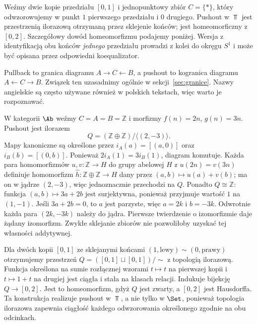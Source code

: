 \begin{przyklad}
Weźmy dwie kopie przedziału $[0,1]$ i jednopunktowy zbiór $C=\{*\}$, który odwzorowujemy w punkt $1$ pierwszego przedziału i $0$ drugiego. Pushout w $\Top$ jest przestrzenią ilorazową otrzymaną przez sklejenie końców; jest homeomorficzny z $[0,2]$. Szczegółowy dowód homeomorfizmu podajemy poniżej. Wersja z identyfikacją obu końców \emph{jednego} przedziału prowadzi z kolei do okręgu $S^1$ i może być opisana przez odpowiedni koequalizator.
\end{przyklad}

\begin{uwaga}
Pullback to granica diagramu $A\to C\leftarrow B$, a pushout to kogranica diagramu $A\leftarrow C\to B$. Związek ten uzasadnimy ogólnie w sekcji~\ref{sec:granice}. Nazwy angielskie są często używane również w polskich tekstach, więc warto je rozpoznawać.
\end{uwaga}


\begin{przyklad}
W kategorii $\Ab$ weźmy $C=A=B=\mathbb Z$ i morfizmy $f(n)=2n$, $g(n)=3n$. Pushout jest ilorazem
\[
Q=(\mathbb Z\oplus\mathbb Z)/\langle(2,-3)\rangle.
\]
Mapy kanoniczne są określone przez $i_A(a)=[(a,0)]$ oraz $i_B(b)=[(0,b)]$. Ponieważ $2i_A(1)=3i_B(1)$, diagram komutuje. Każda para homomorfizmów $u,v:\mathbb Z\to H$ do grupy abelowej $H$ z $u(2n)=v(3n)$ definiuje homomorfizm $\widehat h:\mathbb Z\oplus\mathbb Z\to H$ dany przez $(a,b)\mapsto u(a)+v(b)$; ma on w jądrze $(2,-3)$, więc jednoznacznie przechodzi na $Q$. Ponadto $Q\cong\mathbb Z$: funkcja $(a,b)\mapsto3a+2b$ jest surjektywna, ponieważ przyjmuje wartość $1$ na $(1,-1)$. Jeśli $3a+2b=0$, to $a$ jest parzyste, więc $a=2k$ i $b=-3k$. Odwrotnie każda para $(2k,-3k)$ należy do jądra. Pierwsze twierdzenie o izomorfizmie daje żądany izomorfizm. Zwykłe sklejanie zbiorów nie pozwoliłoby uzyskać tej własności addytywnej.
\end{przyklad}

\begin{przyklad}
Dla dwóch kopii $[0,1]$ ze sklejanymi końcami $(1,\mathrm{lewy})\sim(0,\mathrm{prawy})$ otrzymujemy przestrzeń $Q=([0,1]\sqcup[0,1])/{\sim}$ z topologią ilorazową. Funkcja określona na sumie rozłącznej wzorami $t\mapsto t$ na pierwszej kopii i $t\mapsto1+t$ na drugiej jest ciągła i stała na klasach relacji. Indukuje bijekcję $Q\to[0,2]$. Jest to homeomorfizm, gdyż $Q$ jest zwarty, a $[0,2]$ jest Hausdorffa. Ta konstrukcja realizuje pushout w $\Top$, a nie tylko w $\Set$, ponieważ topologia ilorazowa zapewnia ciągłość każdego odwzorowania określonego zgodnie na obu odcinkach.
\end{przyklad}

